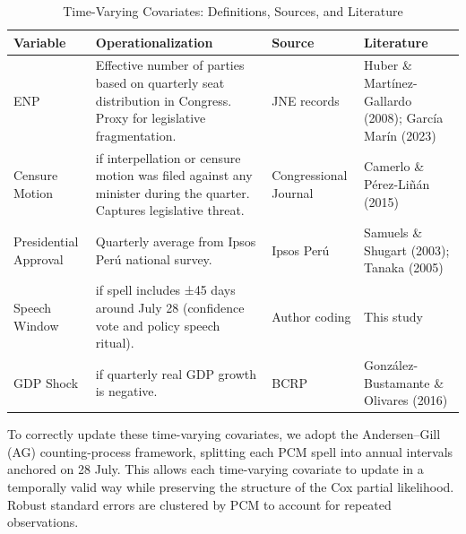 \documentclass[a4paper, 12pt]{article}
\begin{document}
\begin{table}[htbp]
\small
\centering
\caption{Time-Varying Covariates: Definitions, Sources, and Literature}
\label{tab:timevarying}
\begin{tabularx}{\textwidth}{
  >{\raggedright\arraybackslash}p{2cm}
  >{\raggedright\arraybackslash}p{5cm}
  >{\raggedright\arraybackslash}p{2cm}
  >{\raggedright\arraybackslash}p{3.5cm}
}
\toprule
\textbf{Variable} & \textbf{Operationalization} & \textbf{Source} & \textbf{Literature} \\
\midrule

ENP &
Effective number of parties based on quarterly seat distribution in Congress. Proxy for legislative fragmentation. &
JNE records &
Huber \& Martínez-Gallardo (2008); García Marín (2023) \\

Censure Motion &
1 if interpellation or censure motion was filed against any minister during the quarter. Captures legislative threat. &
Congressional Journal &
Camerlo \& Pérez-Liñán (2015) \\

Presidential Approval &
Quarterly average from Ipsos Perú national survey. &
Ipsos Perú &
Samuels \& Shugart (2003); Tanaka (2005) \\

Speech Window &
1 if spell includes ±45 days around July 28 (confidence vote and policy speech ritual). &
Author coding &
This study \\

GDP Shock &
1 if quarterly real GDP growth is negative. &
BCRP &
González-Bustamante \& Olivares (2016) \\

\bottomrule
\end{tabularx}
\end{table}

To correctly update these time-varying covariates, we adopt the Andersen–Gill (AG) counting-process framework, splitting each PCM spell into annual intervals anchored on 28 July. This allows each time-varying covariate to update in a temporally valid way while preserving the structure of the Cox partial likelihood. Robust standard errors are clustered by PCM to account for repeated observations.


\end{document}
